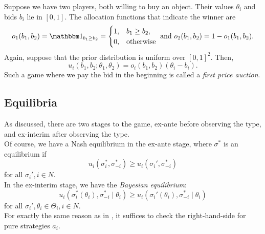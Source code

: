 	\begin{fex}
		\label{ex: sealed bid auction}
		Suppose we have two players, both willing to buy an object. Their values $\theta_i$ and bids $b_i$ lie in $[0,1]$. The allocation functions that indicate the winner are
		\[ o_1(b_1,b_2) = \indic_{b_1 \ge b_2} = \begin{cases} 1, & b_1 \ge b_2, \\ 0, & \text{otherwise} \end{cases} \text{ and } o_2(b_1,b_2) = 1 - o_1(b_1,b_2). \]
		Again, suppose that the prior distribution is uniform over $[0,1]^2$. Then,
		\[ u_i(b_1,b_2;\theta_1,\theta_2) = o_i(b_1,b_2)(\theta_i - b_i). \]
		Such a game where we pay the bid in the beginning is called a \emph{first price auction}.
	\end{fex}

\subsection{Equilibria}

	As discussed, there are two stages to the game, ex-ante before observing the type, and ex-interim after observing the type.\\
	Of course, we have a Nash equilibrium in the ex-ante stage, where $\sigma^*$ is an equilibrium if
	\[ u_i(\sigma_i^*,\sigma_{-i}^*) \ge u_i(\sigma_i',\sigma_{-i}^*) \]
	for all $\sigma_i',i \in N$.\\
	In the ex-interim stage, we have the \emph{Bayesian equilibrium}:
	\[ u_i(\sigma_i^*(\theta_i) , \sigma_{-i}^* \mid \theta_i) \ge u_i(\sigma_i'(\theta_i),\sigma_{-i}^* \mid \theta_i) \]
	for all $\sigma_i',\theta_i \in \Theta_i, i \in N$.\\

	For exactly the same reason as in , it suffices to check the right-hand-side for pure strategies $a_i$.


